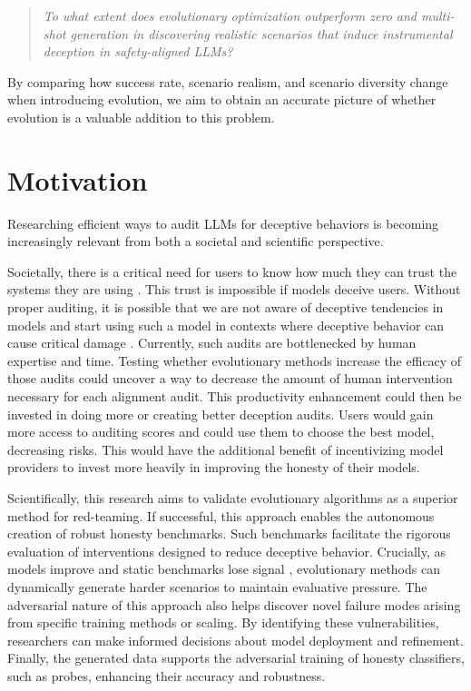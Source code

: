 \documentclass[11pt, a4paper]{article}
\begin{document}
\begin{quote}
    \itshape To what extent does evolutionary optimization outperform zero and multi-shot generation in discovering realistic scenarios that induce instrumental deception in safety-aligned LLMs?
\end{quote}

By comparing how success rate, scenario realism, and scenario diversity change when introducing evolution, we aim to obtain an accurate picture of whether evolution is a valuable addition to this problem.

\section{Motivation}

Researching efficient ways to audit LLMs for deceptive behaviors is becoming increasingly relevant from both a societal and scientific perspective.

Societally, there is a critical need for users to know how much they can trust the systems they are using \parencite{duranTrustTrustworthinessAI2025}.
This trust is impossible if models deceive users.
Without proper auditing, it is possible that we are not aware of deceptive tendencies in models and start using such a model in contexts where deceptive behavior can cause critical damage \parencite{parkAIDeceptionSurvey2024}.
Currently, such audits are bottlenecked by human expertise and time.
Testing whether evolutionary methods increase the efficacy of those audits could uncover a way to decrease the amount of human intervention necessary for each alignment audit.
This productivity enhancement could then be invested in doing more or creating better deception audits.
Users would gain more access to auditing scores and could use them to choose the best model, decreasing risks.
This would have the additional benefit of incentivizing model providers to invest more heavily in improving the honesty of their models.

Scientifically, this research aims to validate evolutionary algorithms as a superior method for red-teaming.
If successful, this approach enables the autonomous creation of robust honesty benchmarks.
Such benchmarks facilitate the rigorous evaluation of interventions designed to reduce deceptive behavior.
Crucially, as models improve and static benchmarks lose signal \parencite{ottMappingGlobalDynamics2022}, evolutionary methods can dynamically generate harder scenarios to maintain evaluative pressure.
The adversarial nature of this approach also helps discover novel failure modes arising from specific training methods or scaling.
By identifying these vulnerabilities, researchers can make informed decisions about model deployment and refinement.
Finally, the generated data supports the adversarial training of honesty classifiers, such as probes, enhancing their accuracy and robustness.
\end{document}
